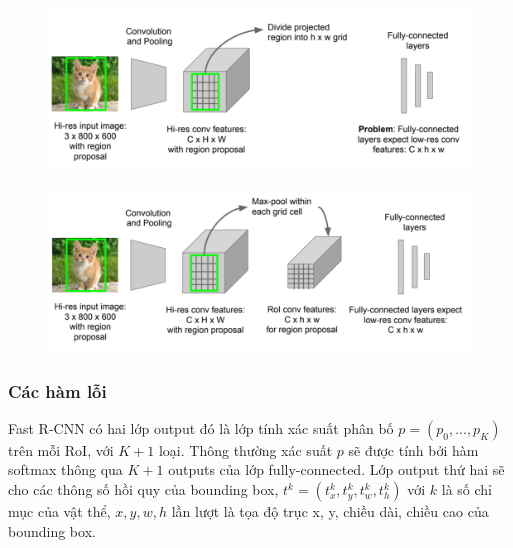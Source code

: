 \begin{center}
    \begin{figure}[H]
    \centering
    \includegraphics[width=0.8\columnwidth]{images/chap2/fastRCNN_3.png}
    \label{chap2:cat3}
    \end{figure}
\end{center}
\begin{center}
    \begin{figure}[H]
    \centering
    \includegraphics[width=0.8\columnwidth]{images/chap2/fastRCNN_4.png}
    \label{chap2:cat4}
    \end{figure}
\end{center}
\subsubsection{Các hàm lỗi}
Fast R-CNN có hai lớp output đó là lớp tính xác suất phân bố $\mathbin{p} = (p_0, ..., p_K)$ trên mỗi RoI, với $K + 1$ loại. Thông thường xác suất $p$ sẽ được tính bởi hàm softmax thông qua $\mathbin{K} + 1$  outputs của lớp fully-connected. Lớp output thứ hai sẽ cho các thông số hồi quy của bounding box, $t^k = (t_x^k, t_y^k, t_w^k, t_h^k)$ với $\mathbin{k}$ là số chỉ mục của vật thể, $x, y, w, h$ lần lượt là tọa độ trục x, y, chiều dài, chiều cao của bounding box.

